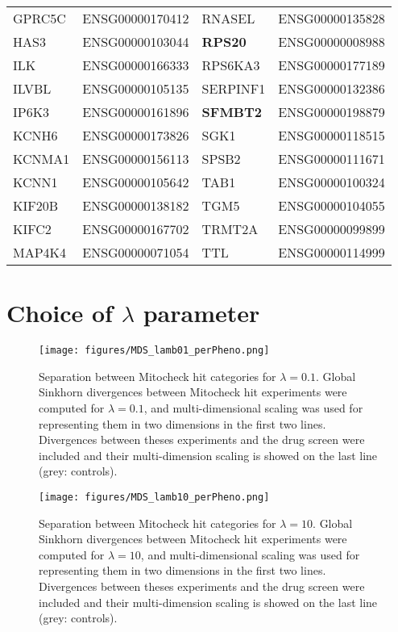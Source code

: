 \begin{table}[!ht]
\begin{tabular}{|l|l||l|l|}
GPRC5C  &  ENSG00000170412  &  RNASEL  &  ENSG00000135828  \\
HAS3  &  ENSG00000103044  &  \textbf{RPS20 } &  ENSG00000008988  \\
ILK  &  ENSG00000166333  &  RPS6KA3  &  ENSG00000177189  \\
ILVBL  &  ENSG00000105135  &  SERPINF1  &  ENSG00000132386  \\
IP6K3  &  ENSG00000161896  &  \textbf{SFMBT2}  &  ENSG00000198879  \\
KCNH6  &  ENSG00000173826  &  SGK1  &  ENSG00000118515  \\
KCNMA1  &  ENSG00000156113  &  SPSB2  &  ENSG00000111671  \\
KCNN1  &  ENSG00000105642  &  TAB1  &  ENSG00000100324  \\
KIF20B  &  ENSG00000138182  &  TGM5  &  ENSG00000104055  \\
KIFC2  &  ENSG00000167702  &  TRMT2A  &  ENSG00000099899  \\
MAP4K4  &  ENSG00000071054  &  TTL  &  ENSG00000114999  \\

\hline
\end{tabular}
\end{table}
\clearpage
\section{Choice of $\lambda$ parameter}
\label{choice_param_Sinkhorn}
\begin{figure*}[ht!]
\centerline{
\texttt{[image: figures/MDS\_lamb01\_perPheno.png]}
}
\caption{Separation between Mitocheck hit categories for $\lambda=0.1$. Global Sinkhorn divergences between Mitocheck hit experiments were computed for $\lambda=0.1$, and multi-dimensional scaling was used for representing them in two dimensions in the first two lines. Divergences between theses experiments and the drug screen were included and their multi-dimension scaling is showed on the last line (grey: controls).}
\label{lambda_choice2}
\end{figure*}
\begin{figure*}[ht!]
\centerline{
\texttt{[image: figures/MDS\_lamb10\_perPheno.png]}}
\caption{Separation between Mitocheck hit categories for $\lambda=10$. Global Sinkhorn divergences between Mitocheck hit experiments were computed for $\lambda=10$, and multi-dimensional scaling was used for representing them in two dimensions in the first two lines. Divergences between theses experiments and the drug screen were included and their multi-dimension scaling is showed on the last line (grey: controls).}
\label{lambda_choice3}
\end{figure*}

